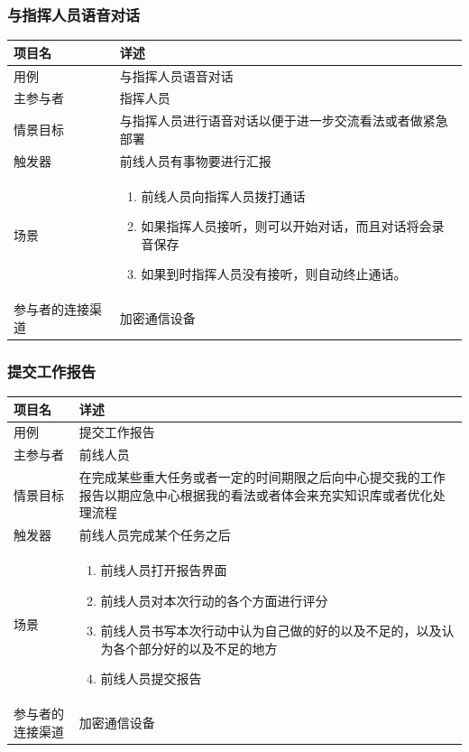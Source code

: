 \documentclass{ctexrep}
\begin{document}
\subsubsection{与指挥人员语音对话}
\begin{longtable}{p{2cm} | p{10cm}}
\hline
项目名 & 详述 \\
\hline
\hline
用例 & 与指挥人员语音对话 \\
\hline
主参与者 &  指挥人员\\
\hline
情景目标 &  与指挥人员进行语音对话以便于进一步交流看法或者做紧急部署\\
\hline
触发器 & 前线人员有事物要进行汇报\\
\hline
场景 & \begin{enumerate}
	\item 前线人员向指挥人员拨打通话
	\item 如果指挥人员接听，则可以开始对话，而且对话将会录音保存
	\item 如果到时指挥人员没有接听，则自动终止通话。
\end{enumerate} \\
\hline
参与者的连接渠道 &加密通信设备 \\
\hline
\end{longtable}

\subsubsection{提交工作报告}
\begin{longtable}{p{2cm} | p{10cm}}
\hline
项目名 & 详述 \\
\hline
\hline
用例 &  提交工作报告\\
\hline
主参与者 & 前线人员 \\
\hline
情景目标 &  在完成某些重大任务或者一定的时间期限之后向中心提交我的工作报告以期应急中心根据我的看法或者体会来充实知识库或者优化处理流程\\
\hline
触发器 & 前线人员完成某个任务之后\\
\hline
场景 & \begin{enumerate}
	\item 前线人员打开报告界面
	\item 前线人员对本次行动的各个方面进行评分
	\item 前线人员书写本次行动中认为自己做的好的以及不足的，以及认为各个部分好的以及不足的地方
	\item 前线人员提交报告
\end{enumerate} \\
\hline
参与者的连接渠道 & 加密通信设备\\
\hline
\end{longtable}
\end{document}
